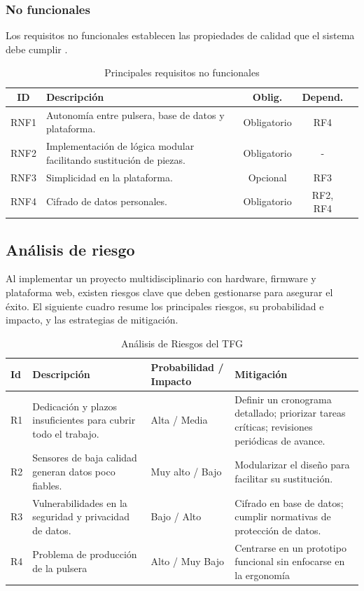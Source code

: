 \documentclass[12pt, a4paper]{article}
\begin{document}
	
	
		\subsubsection{No funcionales}
		
		Los requisitos no funcionales establecen las propiedades de calidad que el sistema debe cumplir \cite{ieee830}.
		
		\begin{table}[ht]
			\centering
			\caption{Principales requisitos no funcionales}
			\label{tab:req-no-funcionales}
			\begin{tabular}{|c|p{6cm}|c|c|c|}
				\hline
				\textbf{ID} & \textbf{Descripción} & \textbf{Oblig.} & \textbf{Depend.}  \\
				\hline
				RNF1 & Autonomía entre pulsera, base de datos y plataforma. & Obligatorio & RF4 \\
				\hline
				RNF2 & Implementación de lógica modular facilitando sustitución de piezas. & Obligatorio & -  \\
				\hline
				RNF3 & Simplicidad en la plataforma. & Opcional & RF3\\
				\hline
				RNF4 & Cifrado de datos personales. & Obligatorio & RF2, RF4 \\
				\hline
			\end{tabular}
		\end{table}

	
		\subsection{Análisis de riesgo}
		Al implementar un proyecto multidisciplinario con hardware, firmware y plataforma web, existen riesgos clave que deben gestionarse para asegurar el éxito. El siguiente cuadro resume los principales riesgos, su probabilidad e impacto, y las estrategias de mitigación.
		
		\begin{table}[ht]
			\centering
			\caption{Análisis de Riesgos del TFG}
			\begin{tabular}{|p{1cm}|p{5cm}|p{3cm}|p{6cm}|}
				\hline
				\textbf{Id} & \textbf{Descripción} & \textbf{Probabilidad / Impacto} & \textbf{Mitigación} \\
				\hline
				R1 & Dedicación y plazos insuficientes para cubrir todo el trabajo. & Alta / Media & Definir un cronograma detallado; priorizar tareas críticas; revisiones periódicas de avance. \\
				\hline
				R2 & Sensores de baja calidad generan datos poco fiables. & Muy alto / Bajo & Modularizar el diseño para facilitar su sustitución. \\
				\hline
				R3 & Vulnerabilidades en la seguridad y privacidad de datos. & Bajo / Alto &  Cifrado en base de datos; cumplir normativas de protección de datos. \\
				\hline
				R4 & Problema de producción de la pulsera & Alto / Muy Bajo & Centrarse en un prototipo funcional sin enfocarse en la ergonomía \\
				\hline
			\end{tabular}
		\end{table}
	
\end{document}
